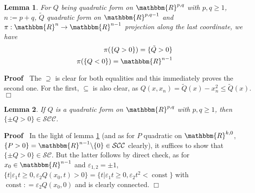 \documentclass{article}
\newcommand{\assign}{:=}
\newcommand{\tmop}[1]{\ensuremath{\operatorname{#1}}}
\newenvironment{proof}{\noindent\textbf{Proof\ }}{\hspace*{\fill}$\Box$\medskip}
\numberwithin{definition}{section}
\newtheorem{lemma}{Lemma}
\numberwithin{lemma}{section}
\numberwithin{proposition}{section}
{\theorembodyfont{\rmfamily}\newtheorem{remark}{Remark}
\numberwithin{remark}{section}
}
\begin{document}
\begin{lemma}
  \label{lem67:lem-geom-aux}For $Q$ being quadratic form on $\mathbbm{R}^{p,
  q}$ with $p, q \geqslant 1$, $n \assign p + q$, $\tilde{Q}$ quadratic form
  on $\mathbbm{R}^{p, q - 1}$ and $\pi : \mathbbm{R}^n \rightarrow
  \mathbbm{R}^{n - 1}$ projection along the last coordinate, we have
  \begin{eqnarray*}
    \pi ( \{ Q > 0 \}) = \{ \tilde{Q} > 0 \} &  & \\
    \pi ( \{ Q < 0 \}) =\mathbbm{R}^{n - 1} &  & 
  \end{eqnarray*}
\end{lemma}

\begin{proof}
  The $\supseteq$ is clear for both equalities and this immediately proves the
  second one. For the first, $\subseteq$ is also clear, as $Q ( x, x_n) =
  \tilde{Q} ( x) - x_n^2 \leqslant \tilde{Q} ( x)$.
\end{proof}

\begin{lemma}
  \label{lem67:lem-geom}If $Q$ is a quadratic form on $\mathbbm{R}^{p, q}$
  with $p, q \geqslant 1$, then $\{ \pm Q > 0 \} \in
  \mathcal{S}\mathcal{C}\mathcal{C}$.
\end{lemma}

\begin{proof}
  In the light of lemma \ref{lem67:lem-geom-aux} (and as for $P$ quadratic on
  $\mathbbm{R}^{k, 0}$, $\{ P > 0 \} =\mathbbm{R}^{n - 1} \backslash \{ 0 \}
  \in \mathcal{S}\mathcal{C}\mathcal{C}$ clearly), it suffices to show that
  $\{ \pm Q > 0 \} \in \mathcal{S}\mathcal{C}$. But the latter follows by
  direct check, as for $x_0 \in \mathbbm{R}^{n - 1}$ and $\varepsilon_{1, 2} =
  \pm 1$, $\{ t | \varepsilon_1 t \geqslant 0, \varepsilon_2 Q ( x_0, t) > 0
  \} = \{ t | \varepsilon_1 t \geqslant 0, \varepsilon_2 t^2 < \tmop{const}
  \}$ with $\tmop{const} : = \varepsilon_2 Q ( x_0, 0)$ and is clearly
  connected.
\end{proof}
\end{document}
